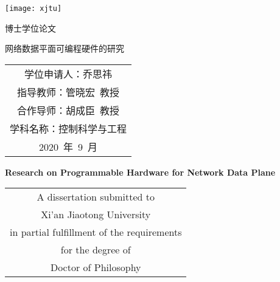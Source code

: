 
\begin{titlepage}
	\begin{center}
		\begin{figure*}[!ht]\vspace{5em}
			\centering
			\texttt{[image: xjtu]}
		\end{figure*}
		
		\vspace{1.5em}
		\begin{center} { 博士学位论文} \end{center}
		
		\vspace{8.5em}
		\begin{center} {\sanhao\boldsong 网络数据平面可编程硬件的研究}\end{center}
		
		\vspace{15em}
		{\sanhao
			\begin{center} \renewcommand{\arraystretch}{1.5}
				\begin{tabular}{c}
					学位申请人：乔思祎 \\
					指导教师：管晓宏~教授 \\
					合作导师：胡成臣~教授 \\
					学科名称：控制科学与工程 \\
					2020~年~9~月 \\
				\end{tabular} \renewcommand{\arraystretch}{1}
			\end{center} 
		}
	\end{center}
	\clearpage{\pagestyle{empty}\cleardoublepage}
	
	\newpage\thispagestyle{empty}
	\begin{center}
		\parbox[t][0.7cm][t]{\textwidth}{}
		
		\begin{center}{\sanhao\bfseries Research on Programmable Hardware for Network Data Plane}\end{center}
		
		\vspace{4.7cm}
		{\sanhao
			\begin{center} \renewcommand{\arraystretch}{1.4}
				\begin{tabular}{c}
					A dissertation submitted to  \\
					Xi'an Jiaotong University \\
					in partial fulfillment of the requirements \\
					for the degree of \\
					Doctor of Philosophy \\
				\end{tabular} \renewcommand{\arraystretch}{1}
			\end{center} 
		}
		

\end{center}
\end{titlepage}
